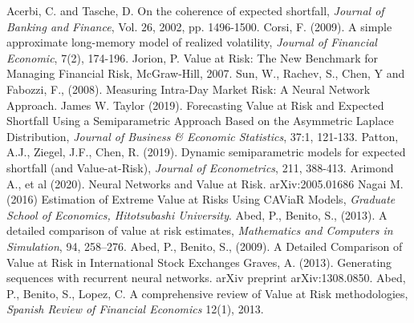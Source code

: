 \documentclass[a4paper,11pt,oneside]{book}
\begin{document}



Acerbi, C. and Tasche, D. On the coherence of expected shortfall, \textit{Journal of Banking and Finance}, Vol. 26, 2002,
pp. 1496-1500.\newline\newline
Corsi, F. (2009). A simple approximate long-memory model of realized volatility, \textit{Journal of
Financial Economic}, 7(2), 174-196.\newline\newline 
Jorion, P. Value at Risk: The New Benchmark for Managing Financial Risk, McGraw-Hill, 2007.\newline\newline
Sun, W., Rachev, S., Chen, Y and Fabozzi, F., (2008). Measuring Intra-Day Market
Risk: A Neural Network Approach.\newline\newline
James W. Taylor (2019). Forecasting Value at Risk and Expected Shortfall
Using a Semiparametric Approach Based on the Asymmetric Laplace Distribution, \textit{Journal of
Business \& Economic Statistics}, 37:1, 121-133.\newline\newline
Patton, A.J., Ziegel, J.F., Chen, R. (2019). Dynamic semiparametric models for expected shortfall
(and Value-at-Risk), \textit{Journal of Econometrics}, 211, 388-413.\newline\newline
Arimond A., et al (2020). Neural Networks and Value at Risk. 	arXiv:2005.01686\newline\newline
Nagai M. (2016) Estimation of Extreme Value at Risks Using CAViaR Models, \textit{Graduate School of Economics, Hitotsubashi University}.\newline\newline
Abed, P., Benito, S., (2013). A detailed comparison of value at risk estimates, \textit{Mathematics and Computers in Simulation}, 94, 258–276.\newline\newline
Abed, P., Benito, S., (2009). A Detailed Comparison of Value at Risk in International Stock Exchanges\newline\newline
Graves, A. (2013). Generating sequences with recurrent neural networks. arXiv preprint arXiv:1308.0850.\newline\newline
Abed, P., Benito, S., Lopez, C. A comprehensive review of Value at Risk methodologies, \textit{Spanish Review of Financial Economics} 12(1), 2013. \\\\
\end{document}
